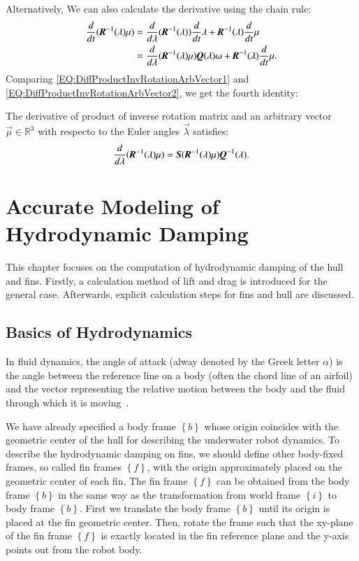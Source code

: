 Alternatively, We can also calculate the derivative using the chain rule:
\begin{align}
\dfrac{d}{dt}(\emph{\textbf{R}}^{-1}(\vec{\lambda})\vec{\mu})
&=\dfrac{d}{d\vec{\lambda}}(\emph{\textbf{R}}^{-1}(\vec{\lambda}))\dfrac{d}{dt}\vec{\lambda}+
\emph{\textbf{R}}^{-1}(\vec{\lambda})\dfrac{d}{dt}\vec{\mu} \nonumber \\
&=\dfrac{d}{d\vec{\lambda}}(\emph{\textbf{R}}^{-1}(\vec{\lambda})\vec{\mu})\emph{\textbf{Q}}(\vec{\lambda})\vec{\omega}+
\emph{\textbf{R}}^{-1}(\vec{\lambda})\dfrac{d}{dt}\vec{\mu}.\label{EQ:DiffProductInvRotationArbVector2}
\end{align}
Comparing \ref{EQ:DiffProductInvRotationArbVector1} and \ref{EQ:DiffProductInvRotationArbVector2}, we get the fourth identity:
\begin{identity}
 The derivative of product of inverse rotation matrix and an arbitrary vector $\vec{\mu}\in \mathbb{R}^{3}$ with respecto to the Euler angles $\vec{\lambda}$ satisfies:
 \begin{align}
\dfrac{d}{d\vec{\lambda}}(\emph{\textbf{R}}^{-1}(\vec{\lambda})\vec{\mu})=\emph{\textbf{S}}(\emph{\textbf{R}}^{-1}(\vec{\lambda})\vec{\mu})\emph{\textbf{Q}}^{-1}(\vec{\lambda}).
\end{align}
\end{identity}
\chapter{Accurate Modeling of Hydrodynamic Damping}
\label{Appendix:AccurateHydrodynamicModeling}
This chapter focuses on the computation of hydrodynamic damping of the hull and fins. Firstly, a calculation method of lift and drag is introduced for the general case. Afterwards, explicit calculation steps for fins and hull are discussed.
\section{Basics of Hydrodynamics }
In fluid dynamics, the angle of attack (alway denoted by the Greek letter $\alpha$) is the angle between the reference line on a body (often the chord line of an airfoil) and the vector representing the relative motion between the body and the fluid through which it is moving~\cite{nasa}.

We have already specified a body frame $\left\{ b \right\}$ whose origin coincides with the geometric center of the hull for describing the underwater robot dynamics. To describe the hydrodynamic damping on fins, we should define other body-fixed frames, so called fin frames $\left\{ f \right\}$, with the origin approximately placed on the geometric center of each fin. The fin frame $\left\{ f \right\}$ can be obtained from the body frame $\left\{ b \right\}$ in the same way as the transformation from world frame $\left\{ i \right\}$ to body frame $\left\{ b \right\}$. First we translate the body frame $\left\{ b \right\}$ until its origin is placed at the fin geometric center. Then, rotate the frame such that the xy-plane of the fin frame $\left\{ f \right\}$ is exactly located in the fin reference plane and the y-axis points out from the robot body.

